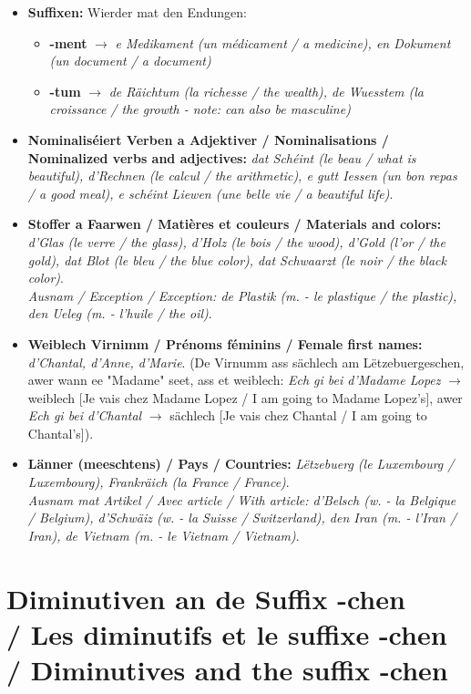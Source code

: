 \begin{itemize}
    \item \textbf{Suffixen:} Wierder mat den Endungen:
        \begin{itemize}
            \item \textbf{-ment} $\rightarrow$ \textit{e Medikament (un médicament / a medicine), en Dokument (un document / a document)}
            \item \textbf{-tum} $\rightarrow$ \textit{de Räichtum (la richesse / the wealth), de Wuesstem (la croissance / the growth - note: can also be masculine)}
        \end{itemize}
    \item \textbf{Nominaliséiert Verben a Adjektiver / Nominalisations / Nominalized verbs and adjectives:} \textit{dat Schéint (le beau / what is beautiful), d'Rechnen (le calcul / the arithmetic), e gutt Iessen (un bon repas / a good meal), e schéint Liewen (une belle vie / a beautiful life)}.
    \item \textbf{Stoffer a Faarwen / Matières et couleurs / Materials and colors:} \textit{d'Glas (le verre / the glass), d'Holz (le bois / the wood), d'Gold (l'or / the gold), dat Blot (le bleu / the blue color), dat Schwaarzt (le noir / the black color)}. \\ \textit{Ausnam / Exception / Exception: de Plastik (m. - le plastique / the plastic), den Ueleg (m. - l'huile / the oil)}.
    \item \textbf{Weiblech Virnimm / Prénoms féminins / Female first names:} \textit{d'Chantal, d'Anne, d'Marie}. (De Virnumm ass sächlech am Lëtzebuergeschen, awer wann ee "Madame" seet, ass et weiblech: \textit{Ech gi bei d'Madame Lopez} $\rightarrow$ weiblech [Je vais chez Madame Lopez / I am going to Madame Lopez's], awer \textit{Ech gi bei d'Chantal} $\rightarrow$ sächlech [Je vais chez Chantal / I am going to Chantal's]).
    \item \textbf{Länner (meeschtens) / Pays / Countries:} \textit{Lëtzebuerg (le Luxembourg / Luxembourg), Frankräich (la France / France)}. \\ \textit{Ausnam mat Artikel / Avec article / With article: d'Belsch (w. - la Belgique / Belgium), d'Schwäiz (w. - la Suisse / Switzerland), den Iran (m. - l'Iran / Iran), de Vietnam (m. - le Vietnam / Vietnam)}.
\end{itemize}

\vspace{1cm}

\section[Diminutiven / Diminutifs / Diminutives]{Diminutiven an de Suffix -chen \\/ Les diminutifs et le suffixe -chen \\/ Diminutives and the suffix -chen}

